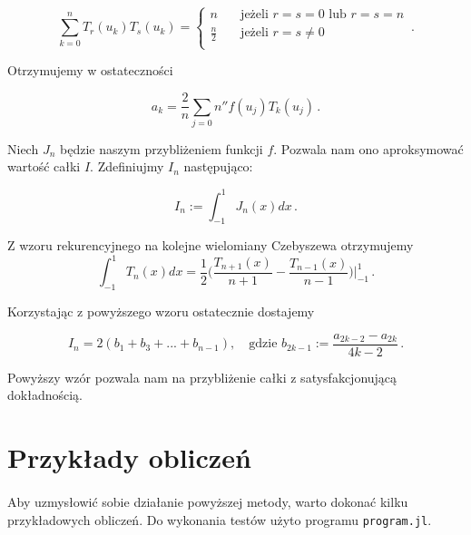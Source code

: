 \documentclass{article}
\begin{document}
    \begin{equation*}
      \sum_{k=0}^{n}T_r(u_k)T_s(u_k) =
        \begin{cases}
          n       & \quad \text{jeżeli } r = s = 0 \text{ lub } r = s = n\\
          \frac{n}{2}  & \quad \text{jeżeli } r = s \neq 0 \\
        \end{cases}\,.
    \end{equation*}

    Otrzymujemy w ostateczności

    \begin{equation*}
      a_k = \frac{2}{n} \sum_{j = 0}{n}'' f(u_j)T_k(u_j)\,.
    \end{equation*}

    Niech $J_n$ będzie naszym przybliżeniem funkcji $f$. Pozwala nam  ono aproksymować
    wartość całki $I$. Zdefiniujmy $I_n$ następująco:

    \begin{equation*}
      I_n := \int_{-1}^{1}J_{n}(x)dx\,.
    \end{equation*}

    Z wzoru rekurencyjnego na kolejne wielomiany Czebyszewa otrzymujemy
    \begin{equation*}
      \int_{-1}^{1}T_{n}(x)dx = \frac{1}{2}\Big(\frac{T_{n+1}(x)}{n+1} - \frac{T_{n-1}(x)}{n-1}\Big)\Big|_{-1}^1\,.
    \end{equation*}

    Korzystając z powyższego wzoru ostatecznie dostajemy

    \begin{equation*}
      I_n = 2(b_1 + b_3 + ... + b_{n-1}),\quad \text{gdzie } b_{2k-1} := \frac{a_{2k-2} - a_{2k}}{4k-2}\,.
    \end{equation*}

    Powyższy wzór pozwala nam na przybliżenie całki z satysfakcjonującą dokładnością.
  \section{Przykłady obliczeń}
    \paragraph{} Aby uzmysłowić sobie działanie powyższej metody, warto dokonać kilku przykładowych
    obliczeń. Do wykonania testów użyto programu \texttt{program.jl}.
\end{document}
